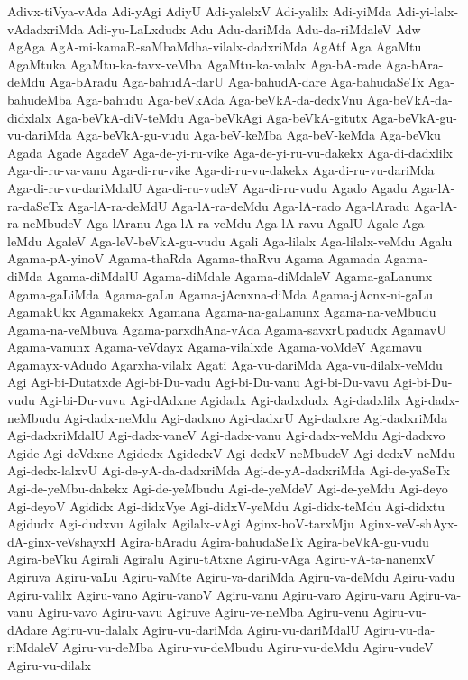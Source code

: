 {Adivx-tiVya-vAda
Adi-yAgi
AdiyU
Adi-yalelxV
Adi-yalilx
Adi-yiMda
Adi-yi-lalx-vAdadxriMda
Adi-yu-LaLxdudx
Adu
Adu-dariMda
Adu-da-riMdaleV
Adw
AgAga
AgA-mi-kamaR-saMbaMdha-vilalx-dadxriMda
AgAtf
Aga
AgaMtu
AgaMtuka
AgaMtu-ka-tavx-veMba
AgaMtu-ka-valalx
Aga-bA-rade
Aga-bAra-deMdu
Aga-bAradu
Aga-bahudA-darU
Aga-bahudA-dare
Aga-bahudaSeTx
Aga-bahudeMba
Aga-bahudu
Aga-beVkAda
Aga-beVkA-da-dedxVnu
Aga-beVkA-da-didxlalx
Aga-beVkA-diV-teMdu
Aga-beVkAgi
Aga-beVkA-gitutx
Aga-beVkA-gu-vu-dariMda
Aga-beVkA-gu-vudu
Aga-beV-keMba
Aga-beV-keMda
Aga-beVku
Agada
Agade
AgadeV
Aga-de-yi-ru-vike
Aga-de-yi-ru-vu-dakekx
Aga-di-dadxlilx
Aga-di-ru-va-vanu
Aga-di-ru-vike
Aga-di-ru-vu-dakekx
Aga-di-ru-vu-dariMda
Aga-di-ru-vu-dariMdalU
Aga-di-ru-vudeV
Aga-di-ru-vudu
Agado
Agadu
Aga-lA-ra-daSeTx
Aga-lA-ra-deMdU
Aga-lA-ra-deMdu
Aga-lA-rado
Aga-lAradu
Aga-lA-ra-neMbudeV
Aga-lAranu
Aga-lA-ra-veMdu
Aga-lA-ravu
AgalU
Agale
Aga-leMdu
AgaleV
Aga-leV-beVkA-gu-vudu
Agali
Aga-lilalx
Aga-lilalx-veMdu
Agalu
Agama-pA-yinoV
Agama-thaRda
Agama-thaRvu
Agama
Agamada
Agama-diMda
Agama-diMdalU
Agama-diMdale
Agama-diMdaleV
Agama-gaLanunx
Agama-gaLiMda
Agama-gaLu
Agama-jAcnxna-diMda
Agama-jAcnx-ni-gaLu
AgamakUkx
Agamakekx
Agamana
Agama-na-gaLanunx
Agama-na-veMbudu
Agama-na-veMbuva
Agama-parxdhAna-vAda
Agama-savxrUpadudx
AgamavU
Agama-vanunx
Agama-veVdayx
Agama-vilalxde
Agama-voMdeV
Agamavu
Agamayx-vAdudo
Agarxha-vilalx
Agati
Aga-vu-dariMda
Aga-vu-dilalx-veMdu
Agi
Agi-bi-Dutatxde
Agi-bi-Du-vadu
Agi-bi-Du-vanu
Agi-bi-Du-vavu
Agi-bi-Du-vudu
Agi-bi-Du-vuvu
Agi-dAdxne
Agidadx
Agi-dadxdudx
Agi-dadxlilx
Agi-dadx-neMbudu
Agi-dadx-neMdu
Agi-dadxno
Agi-dadxrU
Agi-dadxre
Agi-dadxriMda
Agi-dadxriMdalU
Agi-dadx-vaneV
Agi-dadx-vanu
Agi-dadx-veMdu
Agi-dadxvo
Agide
Agi-deVdxne
Agidedx
AgidedxV
Agi-dedxV-neMbudeV
Agi-dedxV-neMdu
Agi-dedx-lalxvU
Agi-de-yA-da-dadxriMda
Agi-de-yA-dadxriMda
Agi-de-yaSeTx
Agi-de-yeMbu-dakekx
Agi-de-yeMbudu
Agi-de-yeMdeV
Agi-de-yeMdu
Agi-deyo
Agi-deyoV
Agididx
Agi-didxVye
Agi-didxV-yeMdu
Agi-didx-teMdu
Agi-didxtu
Agidudx
Agi-dudxvu
Agilalx
Agilalx-vAgi
Aginx-hoV-tarxMju
Aginx-veV-shAyx-dA-ginx-veVshayxH
Agira-bAradu
Agira-bahudaSeTx
Agira-beVkA-gu-vudu
Agira-beVku
Agirali
Agiralu
Agiru-tAtxne
Agiru-vAga
Agiru-vA-ta-nanenxV
Agiruva
Agiru-vaLu
Agiru-vaMte
Agiru-va-dariMda
Agiru-va-deMdu
Agiru-vadu
Agiru-valilx
Agiru-vano
Agiru-vanoV
Agiru-vanu
Agiru-varo
Agiru-varu
Agiru-va-vanu
Agiru-vavo
Agiru-vavu
Agiruve
Agiru-ve-neMba
Agiru-venu
Agiru-vu-dAdare
Agiru-vu-dalalx
Agiru-vu-dariMda
Agiru-vu-dariMdalU
Agiru-vu-da-riMdaleV
Agiru-vu-deMba
Agiru-vu-deMbudu
Agiru-vu-deMdu
Agiru-vudeV
Agiru-vu-dilalx
}
